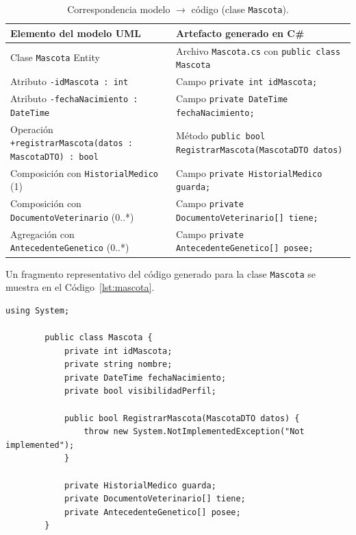 \documentclass[journal,onecolumn]{IEEEtran}
\begin{document}
	\begin{table}[H]
		\caption{Correspondencia modelo $\to$ código (clase \texttt{Mascota}).}
		\label{tab:correspondencia}
		\centering
		\begin{tabularx}{\linewidth}{|L{4.2cm}|X|}
			\hline
			\textbf{Elemento del modelo UML} & \textbf{Artefacto generado en C\#} \\
			\hline
			Clase \texttt{Mascota} \guillemotleft Entity\guillemotright & Archivo \texttt{Mascota.cs} con \texttt{public class Mascota} \\
			\hline
			Atributo \texttt{-idMascota : int} & Campo \texttt{private int idMascota;} \\
			\hline
			Atributo \texttt{-fechaNacimiento : DateTime} & Campo \texttt{private DateTime fechaNacimiento;} \\
			\hline
			Operación \texttt{+registrarMascota(datos : MascotaDTO) : bool} & Método \texttt{public bool RegistrarMascota(MascotaDTO datos)} \\
			\hline
			Composición con \texttt{HistorialMedico} (1) & Campo \texttt{private HistorialMedico guarda;} \\
			\hline
			Composición con \texttt{DocumentoVeterinario} (0..*) & Campo \texttt{private DocumentoVeterinario[] tiene;} \\
			\hline
			Agregación con \texttt{AntecedenteGenetico} (0..*) & Campo \texttt{private AntecedenteGenetico[] posee;} \\
			\hline
		\end{tabularx}
	\end{table}
	
	Un fragmento representativo del código generado para la clase \texttt{Mascota} se muestra en el Código~\ref{lst:mascota}.
	
	\begin{lstlisting}[caption={Clase \texttt{Mascota} generada por Instant Generator (fragmento).}, label={lst:mascota}]
		using System;
		
		public class Mascota {
			private int idMascota;
			private string nombre;
			private DateTime fechaNacimiento;
			private bool visibilidadPerfil;
			
			public bool RegistrarMascota(MascotaDTO datos) {
				throw new System.NotImplementedException("Not implemented");
			}
			
			private HistorialMedico guarda;
			private DocumentoVeterinario[] tiene;
			private AntecedenteGenetico[] posee;
		}
	\end{lstlisting}
	
\end{document}
